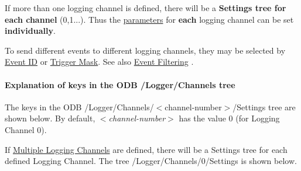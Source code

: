 \begin{DoxyItemize}
\item If more than one logging channel is defined, there will be a {\bfseries Settings tree for each channel} (0,1...). Thus the \hyperlink{structparameters}{parameters} for {\bfseries each} logging channel can be set {\bfseries individually}.
\item To send different events to different logging channels, they may be selected by \hyperlink{F_Logging_Data_F_Logger_CS_Event_ID}{Event ID} or \hyperlink{F_Logging_Data_F_Logger_CS_Trigger_Mask}{Trigger Mask}. See also \hyperlink{F_Logging_Data_F_Logger_Event_Filtering}{Event Filtering} .
\end{DoxyItemize}\hypertarget{F_Logging_Data_F_Logger_Settings}{}\paragraph{Explanation of keys in the ODB /Logger/Channels tree}\label{F_Logging_Data_F_Logger_Settings}
The keys in the ODB /Logger/Channels/$<$channel-\/number$>$/Settings  tree are shown below. By default, {\itshape  $<$channel-\/number$>$ \/} has the value 0 (for Logging Channel 0). \par
 If \hyperlink{F_Logging_Data_F_Logger_multiple_logging_channels}{Multiple Logging Channels} are defined, there will be a Settings tree for each defined Logging Channel. The tree /Logger/Channels/0/Settings is shown below.

\par


